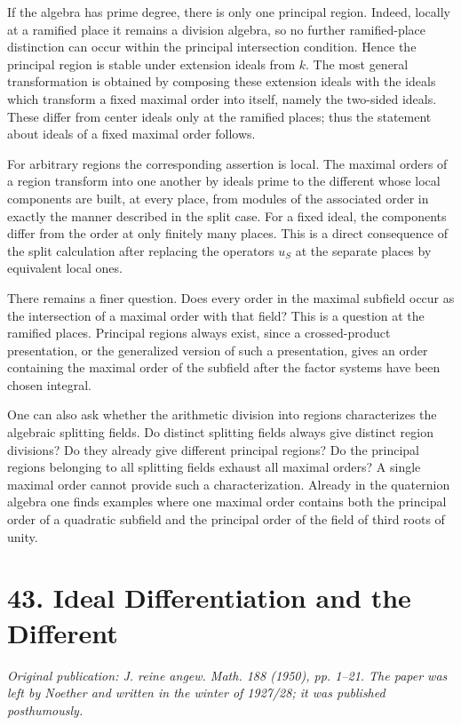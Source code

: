 \documentclass[11pt]{article}
\begin{document}
If the algebra has prime degree, there is only one principal region. Indeed, locally at a ramified place it remains a division algebra, so no further ramified-place distinction can occur within the principal intersection condition. Hence the principal region is stable under extension ideals from \(k\). The most general transformation is obtained by composing these extension ideals with the ideals which transform a fixed maximal order into itself, namely the two-sided ideals. These differ from center ideals only at the ramified places; thus the statement about ideals of a fixed maximal order follows.

For arbitrary regions the corresponding assertion is local. The maximal orders of a region transform into one another by ideals prime to the different whose local components are built, at every place, from modules of the associated order in exactly the manner described in the split case. For a fixed ideal, the components differ from the order at only finitely many places. This is a direct consequence of the split calculation after replacing the operators \(u_S\) at the separate places by equivalent local ones.

There remains a finer question. Does every order in the maximal subfield occur as the intersection of a maximal order with that field? This is a question at the ramified places. Principal regions always exist, since a crossed-product presentation, or the generalized version of such a presentation, gives an order containing the maximal order of the subfield after the factor systems have been chosen integral.

One can also ask whether the arithmetic division into regions characterizes the algebraic splitting fields. Do distinct splitting fields always give distinct region divisions? Do they already give different principal regions? Do the principal regions belonging to all splitting fields exhaust all maximal orders? A single maximal order cannot provide such a characterization. Already in the quaternion algebra one finds examples where one maximal order contains both the principal order of a quadratic subfield and the principal order of the field of third roots of unity.

\clearpage
\section{43. Ideal Differentiation and the Different}

\textit{Original publication: J. reine angew. Math. 188 (1950), pp. 1--21. The paper was left by Noether and written in the winter of 1927/28; it was published posthumously.}
\end{document}
